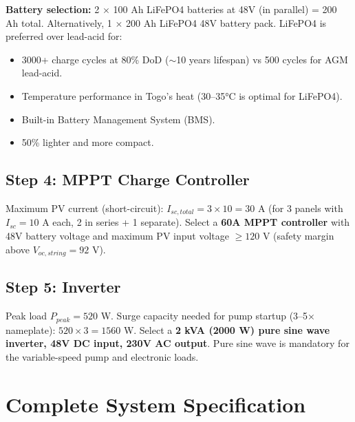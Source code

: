 \documentclass[12pt,a4paper,openany]{book}
\begin{document}
\textbf{Battery selection:} 2 $\times$ 100 Ah LiFePO4 batteries at 48V (in parallel) = 200 Ah total. Alternatively, 1 $\times$ 200 Ah LiFePO4 48V battery pack. LiFePO4 is preferred over lead-acid for:
\begin{itemize}[leftmargin=2em]
  \item 3000+ charge cycles at 80\% DoD ($\sim$10 years lifespan) vs 500 cycles for AGM lead-acid.
  \item Temperature performance in Togo's heat (30--35°C is optimal for LiFePO4).
  \item Built-in Battery Management System (BMS).
  \item 50\% lighter and more compact.
\end{itemize}

\subsection{Step 4: MPPT Charge Controller}

Maximum PV current (short-circuit): $I_{sc,total}=3\times10=30$ A (for 3 panels with $I_{sc}=10$ A each, 2 in series + 1 separate). Select a \textbf{60A MPPT controller} with 48V battery voltage and maximum PV input voltage $\geq 120$ V (safety margin above $V_{oc,string}=92$ V).

\subsection{Step 5: Inverter}

Peak load $P_{peak}=520$ W. Surge capacity needed for pump startup (3--5× nameplate): $520\times3=1560$ W. Select a \textbf{2 kVA (2000 W) pure sine wave inverter, 48V DC input, 230V AC output}. Pure sine wave is mandatory for the variable-speed pump and electronic loads.

\section{Complete System Specification}
\end{document}
